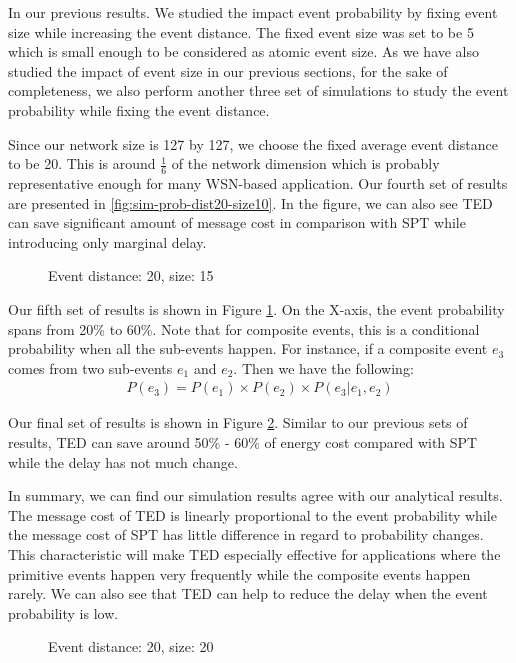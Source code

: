In our previous results. We studied the impact event probability by fixing event size while increasing the event distance. The fixed event size was set to be 5 which is small enough to be considered as atomic event size. As we have also studied the impact of event size in our previous sections, for the sake of completeness, we also perform another three set of simulations to study the event probability while fixing the event distance.

Since our network size is 127 by 127, we choose the fixed average event distance to be 20. This is around \(\frac{1}{6}\) of the network dimension which is probably representative enough for many WSN-based application. Our fourth set of results are presented in \ref{fig:sim-prob-dist20-size10}. In the figure, we can also see TED can save significant amount of message cost in comparison with SPT while introducing only marginal delay.

\begin{figure}
\centering
{}
\caption{Event distance: 20, size: 15}
\label{fig:sim-prob-dist20-size15}
\end{figure}

Our fifth set of results is shown in Figure \ref{fig:sim-prob-dist20-size15}. On the X-axis, the event probability spans from 20\% to 60\%. Note that for composite events, this is a conditional probability when all the sub-events happen. For instance, if a composite event \(e_3\) comes from two sub-events \(e_1\) and \(e_2\). Then we have the following:
\begin{align*}
P(e_3) = P(e_1) \times P(e_2) \times P(e_3|e_1, e_2)
\end{align*}

Our final set of results is shown in Figure \ref{fig:sim-prob-dist20-size20}. Similar to our previous sets of results, TED can save around 50\% - 60\% of energy cost compared with SPT while the delay has not much change.

In summary, we can find our simulation results agree with our analytical results. The message cost of TED is linearly proportional to the event probability while the message cost of SPT has little difference in regard to probability changes. This characteristic will make TED especially effective for applications where the primitive events happen very frequently while the composite events happen rarely. We can also see that TED can help to reduce the delay when the event probability is low.

\begin{figure}
\centering
{}
\caption{Event distance: 20, size: 20}
\label{fig:sim-prob-dist20-size20}
\end{figure}